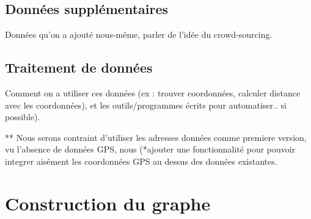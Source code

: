 \subsection{Données supplémentaires}
Données qu'on a ajouté nous-même, parler de l'idée du crowd-sourcing.
\subsection{Traitement de données}
Comment on a utiliser ces données (ex : trouver coordonnées, calculer distance avec les coordonnées), et les outils/programmes écrits pour automatiser.. si possible).
	
** Nous serons contraint d'utiliser les adresses données comme premiere version, vu l'absence de données GPS, nous (*ajouter une fonctionnalité pour pouvoir integrer aisément les coordonnées GPS au dessus des données existantes.


\section{Construction du graphe}

